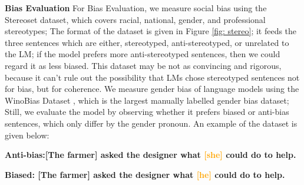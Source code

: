 \noindent \textbf{Bias Evaluation} \quad 
For Bias Evaluation, we measure social bias using the Stereoset \cite{Nadeem2021StereoSetMS} dataset, which covers racial, national, 
gender, and professional stereotypes; The format of the dataset is given in Figure \ref{fig: stereo}; it feeds the three sentences which are either, stereotyped, anti-stereotyped, or unrelated to the LM; if the model prefers more anti-stereotyped sentences, then we could regard it as less biased. This dataset may be not as convincing and rigorous, because it can't rule out the possibility that LMs chose stereotyped sentences not for bias, but for coherence. We measure gender bias of language models using the WinoBias Dataset \cite{Zhao2018GenderBI}, which is the largest manually labelled gender bias dataset; Still, we evaluate the model by observing whether it prefers biased or anti-bias sentences, which only differ by the gender pronoun. An example of the dataset is given below:

\noindent \textbf{Anti-bias:[The farmer] asked the designer what \textcolor{orange}{[she]} could do to help. }

\noindent \textbf{Biased: [The farmer] asked the designer what \textcolor{orange}{[he]} could do to help.} 
